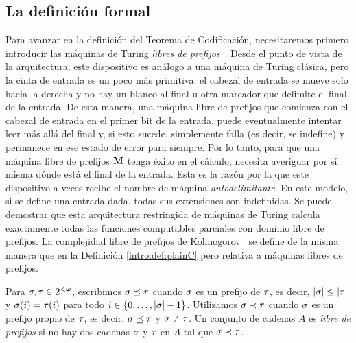 \subsection{La definición formal}



Para avanzar en la definición del Teorema de Codificación, necesitaremos primero introducir las máquinas de Turing {\em libres de prefijos}~\cite{L71,L73,S71,chaitin1975theory}. Desde el punto de vista de la arquitectura, este dispositivo es análogo a una máquina de Turing clásica, pero la cinta de entrada es un poco más primitiva: el cabezal de entrada se mueve solo hacia la derecha y no hay un blanco al final u otra marcador que delimite el final de la entrada. De esta manera, una máquina libre de prefijos que comienza con el cabezal de entrada en el primer bit de la entrada, puede eventualmente intentar leer más allá del final y, si esto sucede, simplemente falla (es decir, se indefine) y permanece en ese estado de error para siempre. Por lo tanto, para que una máquina libre de prefijos ${\bf M}$ tenga éxito en el cálculo, necesita averiguar por sí misma dónde está el final de la entrada. Esta es la razón por la que este dispositivo a veces recibe el nombre de máquina {\em autodelimitante}. En este modelo, si se define una entrada dada, todas sus extensiones son indefinidas. Se puede demostrar que esta arquitectura restringida de máquinas de Turing calcula exactamente todas las funciones computables parciales con dominio libre de prefijos. La complejidad libre de prefijos de Kolmogorov~\cite{levin1974laws,G74,chaitin1975theory} se define de la misma manera que en la Definición \ref{intro:def:plainC} pero relativa a máquinas libres de prefijos.


\begin{definicion}\label{seleccion:def:conjuntolibreprefijos}
Para
$\sigma,\tau\in2^{<\omega}$, escribimos
\glossary{$\preceq$}$\sigma\preceq\tau$ cuando $\sigma$ es un prefijo de
$\tau$, es decir, $| \sigma |\leq| \tau |$ y $\sigma(i)=\tau(i)$
para todo $i\in\{0,\dots,| \sigma |-1 \}$. Utilizamos
\glossary{$\prec$}$\sigma\prec\tau$ cuando $\sigma$ es un prefijo propio de $\tau$, es decir, $\sigma\preceq \tau$ y $\sigma\not=\tau$. Un conjunto de cadenas $A$ es {\em libre de prefijos} si no hay dos cadenas $\sigma$
y $\tau$ en $A$ tal que $\sigma\prec\tau$. 
\end{definicion}


